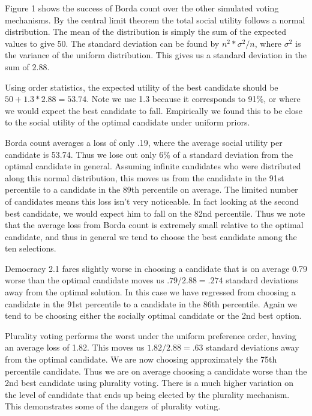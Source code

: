 \documentclass[11pt]{scrartcl}
\begin{document}
Figure 1 shows the success of Borda count over the other simulated voting mechanisms. By the central limit theorem the total social utility follows a normal distribution. The mean of the distribution is simply the sum of the expected values to give 50. The standard deviation can be found by $n^2 * \sigma^2/n$, where $\sigma^2$ is the variance of the uniform distribution. This gives us a standard deviation in the sum of $2.88$.

Using order statistics, the expected utility of the best candidate should be $50 + 1.3*2.88 = 53.74$. Note we use 1.3 because it corresponds to 91\%, or where we would expect the best candidate to fall. Empirically we found this to be close to the social utility of the optimal candidate under uniform priors.

Borda count averages a loss of only .19, where the average social utility per candidate is 53.74. Thus we lose out only 6\% of a standard deviation from the optimal candidate in general. Assuming infinite candidates who were distributed along this normal distribution, this moves us from the candidate in the 91st percentile to a candidate in the 89th percentile on average. The limited number of candidates means this loss isn't very noticeable. In fact looking at the second best candidate, we would expect him to fall on the 82nd percentile. Thus we note that the average loss from Borda count is extremely small relative to the optimal candidate, and thus in general we tend to choose the best candidate among the ten selections.

Democracy 2.1 fares slightly worse in choosing a candidate that is on average 0.79 worse than the optimal candidate moves us $.79/2.88 = .274$ standard deviations away from the optimal solution. In this case we have regressed from choosing a candidate in the 91st percentile to a candidate in the 86th percentile. Again we tend to be choosing either the socially optimal candidate or the 2nd best option.

Plurality voting performs the worst under the uniform preference order, having an average loss of 1.82. This moves us $1.82/2.88 = .63$ standard deviations away from the optimal candidate. We are now choosing approximately the 75th percentile candidate. Thus we are on average choosing a candidate worse than the 2nd best candidate using plurality voting. There is a much higher variation on the level of candidate that ends up being elected by the plurality mechanism. This demonstrates some of the dangers of plurality voting.
\end{document}
